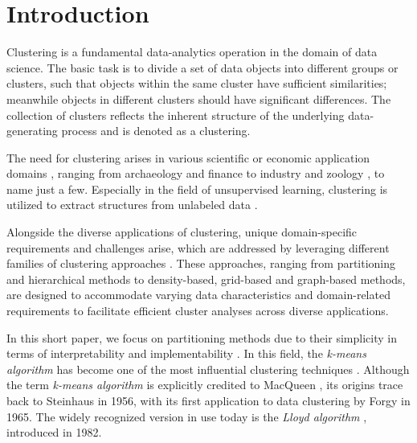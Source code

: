\section{Introduction}

Clustering is a fundamental data-analytics operation in the domain of data science.
The basic task is to divide a set of data objects into different groups or clusters, such that objects within the same cluster have sufficient similarities;
meanwhile objects in different clusters should have significant differences.
The collection of clusters reflects the inherent structure of the underlying data-generating process and is denoted as a clustering.

The need for clustering arises in various scientific or economic application domains \cite{ezugwu2022comprehensive,oyewole2023data, gan2020data}, ranging from archaeology \cite{troiano2024comparative} and finance \cite{cai2016clustering} to industry \cite{lee2021technological} and zoology \cite{shen2021multivariate}, to name just a few. Especially in the field of unsupervised learning, clustering is utilized to extract structures from unlabeled data \cite{chander2023data}.

Alongside the diverse applications of clustering, unique domain-specific requirements and challenges arise, which are addressed by leveraging different families of clustering approaches \cite{xu2015comprehensive,han2012data}. These approaches, ranging from partitioning and hierarchical methods to density-based, grid-based and graph-based methods, are designed to accommodate varying data characteristics and domain-related requirements to facilitate efficient cluster analyses across diverse applications.


In this short paper, we focus on partitioning methods due to their simplicity in terms of interpretability and implementability \cite{DBLP:conf/iiwas/BeecksBHLSD22}. In this field, the \emph{k-means algorithm} \cite{bock2007clustering,hans2008origins,DBLP:journals/prl/Jain10,steinley2006k} has become one of the most influential clustering techniques \cite{DBLP:journals/kais/WuKQGYMMNLYZSHS08,olukanmi2019rethinking}. Although the term \emph{k-means algorithm} is explicitly credited to MacQueen \cite{macqueen1967}, its origins trace back to Steinhaus \cite{steinhaus1956division} in 1956, with its first application to data clustering by Forgy \cite{forgy1965cluster} in 1965. The widely recognized version in use today is the \emph{Lloyd algorithm} \cite{DBLP:journals/tit/Lloyd82}, introduced in 1982.

